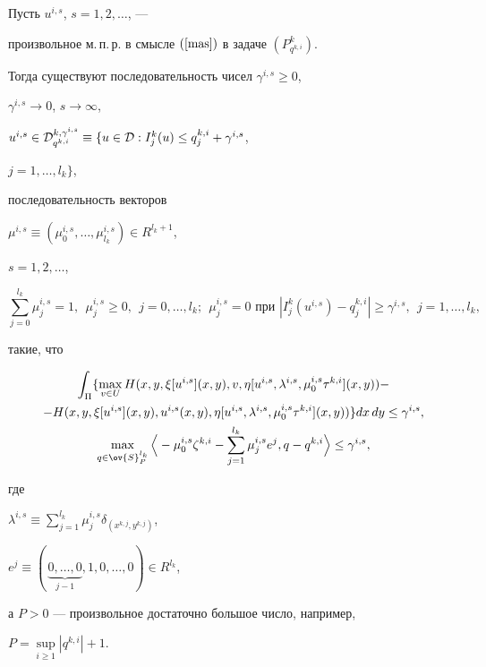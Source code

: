 \begin{lems}\label{amsa} Пусть $u^{i,s}$, $s=1,2,\dotsc$, ---


произвольное м.\,п.\,р. в смысле $(\ref{mas})$ в задаче $(P^k_{q^{k,i}})$.


Тогда существуют последовательность чисел $\gamma^{i,s}\geq 0$,


$\gamma^{i,s}\to 0$, $s\to\infty$,


$u^{i,s}\in {\cal D}^{k, \gamma^{i,s}}_{q^{k,i}}


\equiv\{u\in{\cal D} : I^k_j(u)\leq q^{k,i}_j+\gamma^{i,s}$,


$j=1,\dotsc,l_k\}$,


последовательность векторов


$\mu^{i,s}\equiv(\mu_0^{i,s},\dotsc,\mu_{l_k}^{i,s})\in R^{l_k+1}$,


$s=1,2,\dotsc$,


\begin{equation}\label{***}


\sum_{j=0}^{l_k}\mu^{i, s}_j=1,\ \  


\mu^{i,s}_j\geq 0,\ \ j=0,\dotsc,l_k; 


\ \ \mu^{i,s}_j=0 \text{ при } |I^k_j(u^{i,s})-q^{k,i}_j|\geq\gamma^{i,s},


\ \ j=1,\dotsc,l_k,


\end{equation}


такие, что


\begin{gather}


\int_{\Pi}\{\max_{v\in U}H(x,y,\xi[u^{i,s}](x,y),v,


\eta[u^{i,s}, \lambda^{i,s}, \mu^{i,s}_0\tau^{k,i}](x,y))-\notag \\


%


\label{****}


-H(x,y,\xi[u^{i,s}](x,y),u^{i,s}(x,y),\eta[u^{i,s},\lambda^{i,s},


\mu^{i,s}_0\tau^{k,i}](x,y))\} dx\, dy\leq\gamma^{i,s}, \\


%


\label{*****}


\max_{q\in\ov{S}^{l_k}_P}\Big\langle-


\mu_0^{i,s}\zeta^{k,i}-\sum_{j=1}^{l_k}\mu_j^{i,s}e^j,


q-q^{k,i}\Big\rangle\leq\gamma^{i,s},


\end{gather}


где


$\lambda^{i, s}\equiv\sum\limits_{j=1}^{l_k}\mu^{i, s}_j


\delta_{(x^{k, j}, y^{k, j})}$,


$e^j\equiv(\,\underbrace{0,\dotsc,0}_{j-1},1,0,\dotsc,0)\in R^{l_k}$,


а $P>0$ --- произвольное достаточно большое число, например,


$P=\sup\limits_{i\geq1}|q^{k,i}|+1$.


\end{lems}
